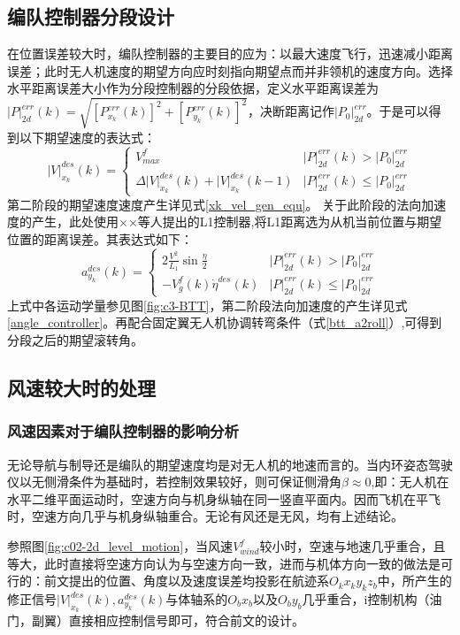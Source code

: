 \subsection{编队控制器分段设计} 
在位置误差较大时，编队控制器的主要目的应为：以最大速度飞行，迅速减小距离误差；此时无人机速度的期望方向应时刻指向期望点而并非领机的速度方向。选择水平距离误差大小作为分段控制器的分段依据，定义水平距离误差为$|P|_{2d}^{err}(k)=\sqrt{[P_{x_k}^{err}(k)]^2+[P_{y_k}^{err}(k)]^2}$，决断距离记作$|P_0|_{2d}^{err}$。于是可以得到以下期望速度的表达式：
\begin{equation}
    |V|_{x_k}^{des}(k)=
    \begin{cases}
        V_{max}^f& |P|_{2d}^{err}(k)>|P_0|_{2d}^{err}\\
        \Delta{|V|}_{x_k}^{des}(k)+{|V|}_{x_k}^{des}(k-1)& |P|_{2d}^{err}(k)\leq|P_0|_{2d}^{err}
    \end{cases}
    \end{equation}
第二阶段的期望速度速度产生详见式\ref{xk_vel_gen_equ}。
关于此阶段的法向加速度的产生，此处使用××等人提出的L1控制器,将L1距离选为从机当前位置与期望位置的距离误差。其表达式如下：
\begin{equation}
    a_{y_k}^{des}(k)=
    \begin{cases}
        2\frac{V^2}{L_1}\sin{\frac{\eta}{2}}& |P|_{2d}^{err}(k)>|P_0|_{2d}^{err}\\
        -V_g^{f}(k)\dot{\eta}^{des}(k)& |P|_{2d}^{err}(k)\leq|P_0|_{2d}^{err}
    \end{cases}
    \end{equation}
上式中各运动学量参见图\ref{fig:c3-BTT}，第二阶段法向加速度的产生详见式\ref{angle_controller}。再配合固定翼无人机协调转弯条件（式\ref{btt_a2roll}）,可得到分段之后的期望滚转角。
\subsection{风速较大时的处理} 
\subsubsection*{风速因素对于编队控制器的影响分析}
无论导航与制导还是编队的期望速度均是对无人机的地速而言的。当内环姿态驾驶仪以无侧滑条件为基础时，若控制效果较好，则可保证侧滑角$\beta\approx 0$,即：无人机在水平二维平面运动时，空速方向与机身纵轴在同一竖直平面内。因而飞机在平飞时，空速方向几乎与机身纵轴重合。无论有风还是无风，均有上述结论。

参照图\ref{fig:c02-2d_level_motion}，当风速$V_{wind}^f$较小时，空速与地速几乎重合，且等大，此时直接将空速方向认为与空速方向一致，进而与机体方向一致的做法是可行的：前文提出的位置、角度以及速度误差均投影在航迹系$O_kx_ky_kz_b$中，所产生的修正信号$|V|_{x_k}^{des}(k),a_{y_k}^{des}(k)$与体轴系的$O_bx_b$以及$O_by_b$几乎重合，i控制机构（油门，副翼）直接相应控制信号即可，符合前文的设计。

